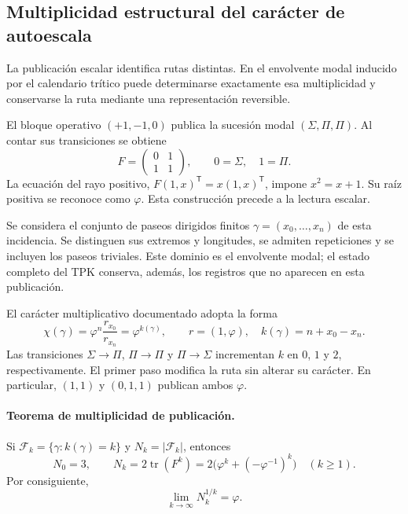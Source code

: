 
\subsection{Multiplicidad estructural del carácter de autoescala}

La publicación escalar identifica rutas distintas. En el envolvente modal
inducido por el calendario trítico puede determinarse exactamente esa
multiplicidad y conservarse la ruta mediante una representación reversible.

El bloque operativo $(+1,-1,0)$ publica la sucesión modal
$(\Sigma,\Pi,\Pi)$. Al contar sus transiciones se obtiene
\[
 F=\begin{pmatrix}0&1\\1&1\end{pmatrix},
 \qquad 0=\Sigma,\quad 1=\Pi.
\]
La ecuación del rayo positivo, $F(1,x)^{\mathsf T}=x(1,x)^{\mathsf T}$,
impone $x^2=x+1$. Su raíz positiva se reconoce como $\varphi$.
Esta construcción precede a la lectura escalar.

Se considera el conjunto de paseos dirigidos finitos
$\gamma=(x_0,\ldots,x_n)$ de esta incidencia. Se distinguen sus extremos
y longitudes, se admiten repeticiones y se incluyen los paseos triviales.
Este dominio es el envolvente modal; el estado completo del TPK conserva,
además, los registros que no aparecen en esta publicación.

El carácter multiplicativo documentado adopta la forma
\[
 \chi(\gamma)=\varphi^n\frac{r_{x_0}}{r_{x_n}}
 =\varphi^{k(\gamma)},\qquad
 r=(1,\varphi),\quad k(\gamma)=n+x_0-x_n.
\]
Las transiciones $\Sigma\to\Pi$, $\Pi\to\Pi$ y $\Pi\to\Sigma$ incrementan
$k$ en $0$, $1$ y $2$, respectivamente. El primer paso modifica la ruta
sin alterar su carácter. En particular, $(1,1)$ y $(0,1,1)$ publican
ambos $\varphi$.

\paragraph{Teorema de multiplicidad de publicación.}
Si $\mathcal F_k=\{\gamma:k(\gamma)=k\}$ y $N_k=|\mathcal F_k|$, entonces
\[
 N_0=3,\qquad
 N_k=2\operatorname{tr}(F^k)
 =2\bigl(\varphi^k+(-\varphi^{-1})^k\bigr)\quad(k\ge1).
\]
Por consiguiente,
\[
 \lim_{k\to\infty}N_k^{1/k}=\varphi.
\]


